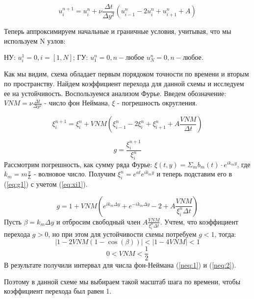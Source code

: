 \begin{equation}
    u_i^{n+1}=u_i^n+\nu \frac{\Delta t}{\Delta y^2} (u_{i-1}^n-2u_i^n+u^n_{i+1}+A)
\end{equation}

Теперь аппроксимируем начальные и граничные условия, учитывая, что мы используем N узлов:

НУ: $u^1_i = 0, i=[1,N]$; ГУ: $u^n_1 = 0, n - \text{любое} $ $u^n_N = 0, n - \text{любое}$.

Как мы видим, схема обладает первым порядоком точности по времени и вторым по пространству. Найдем коэффициент перехода для данной схемы и исследуем ее на устойчивость. Воспользуемся анализом Фурье. Введем обозначение: $VNM=\nu\frac{\Delta t}{\Delta y^2}$ - число фон Неймана, $\xi$ - погрешность округления.

\begin{equation}
    \xi_i^{n+1}=\xi^n_i+VNM(\xi_{i-1}^n-2\xi_i^n+\xi^n_{i+1}+A\frac{VNM}{\Delta t})
    \label{eq:xi1}
\end{equation}

\begin{equation}
    g=\frac{\xi_i^{n+1}}{\xi_i^{n}}
    \label{eq:g1}
\end{equation}
Рассмотрим погрешность, как сумму ряда Фурье: $\xi(t,y)=\Sigma_m b_m(t)\cdot e^{ik_my}$, где $k_m=m\frac{\pi}{L}$ - волновое число. Получим $\xi_i^n=e^{at}e^{ik_my}$ и теперь подставим его в (\ref{eq:g1}) с учетом (\ref{eq:xi1}).

\begin{equation}
    g=1+VNM(e^{ik_m\Delta y}+e^{-ik_m\Delta y}-2+A\frac{VNM}{\xi_i^{n}\Delta t})
\end{equation}
Пусть $\beta=k_m\Delta y$ и отбросим свободный член $A\frac{VNM}{\xi_i^{n}\Delta t}$. Учтем, что коэффициент перехода $g>0$, но при этом для устойчивости схемы потребуем $g<1$, тогда:
\begin{equation}
    |1-2VNM(1-\cos(\beta))|<|1-4VNM|<1
    \label{neq:1}
\end{equation}
\begin{equation}
    0<VNM<\frac{1}{2}
    \label{neq:2}
\end{equation}
В результате получили интервал для числа фон-Неймана (\ref{neq:1}) и (\ref{neq:2}).

Поэтому в данной схеме мы выбираем такой масштаб шага по времени, чтобы коэффициент перехода был равен 1.

